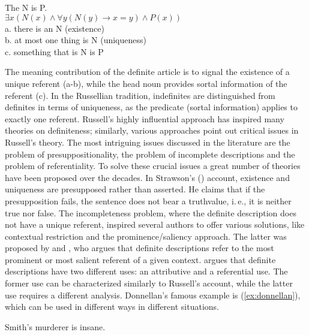 \documentclass[output=paper]{langsci/langscibook}
\begin{document}
\begin{exe}
\ex\label{ex:russell}
The N is P. \\
$\exists x(N(x) \wedge \forall y(N(y) \rightarrow x=y) \wedge P(x))$ \\
a. there is an N (existence) \\
b. at most one thing is N (uniqueness) \\
c. something that is N is P
\end{exe}


The meaning contribution of the definite article is to signal the existence of a unique referent (a-b), while the head noun provides sortal information of the referent (c). In the Russellian tradition, indefinites are distinguished from definites in terms of uniqueness, as the predicate (sortal information) applies to exactly one referent. Russell's highly influential approach has inspired many theories on definiteness; similarly, various approaches point out critical issues in Russell's theory.  The most intriguing issues discussed in the literature are the problem of presuppositionality, the problem of incomplete descriptions and the problem of referentiality. To solve these crucial issues a great number of theories have been proposed over the decades. In Strawson's (\citeyear{strawson:50}) account, existence and uniqueness are presupposed rather than asserted. He claims that if the presupposition fails, the sentence does not bear a truthvalue, i.\,e., it is neither true nor false. The incompleteness problem, where the definite description does not have a unique referent, inspired several authors \citep[e.\,g.,][]{strawson:50,mccawley:79,lewis:79,neale:90} to offer various solutions, like contextual restriction and the prominence/saliency approach. The latter was proposed by \citet{mccawley:79} and \citet{lewis:79}, who argues that definite descriptions refer to the most prominent or most salient referent of a given context. \citet{donnellan:66} argues that definite descriptions have two different uses: an attributive and a referential use. The former use can be characterized similarly to Russell's account, while the latter use requires a different analysis. Donnellan's famous example is (\ref{ex:donnellan}), which can be used in different ways in different situations. 

\begin{exe}
\ex\label{ex:donnellan}
Smith’s murderer is insane. \hfill\citep[][p.285]{donnellan:66}
\end{exe}
\end{document}
